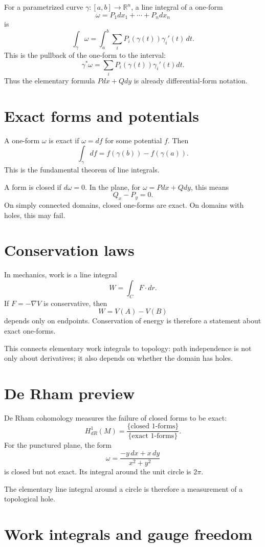 For a parametrized curve $\gamma:[a,b]\to\mathbb R^n$, a line integral of a one-form
\[
  \omega=P_1dx_1+\cdots+P_ndx_n
\]
is
\[
  \int_\gamma \omega
  =\int_a^b \sum_i P_i(\gamma(t))\gamma_i'(t)\,dt.
\]
This is the pullback of the one-form to the interval:
\[
  \gamma^*\omega=\sum_i P_i(\gamma(t))\gamma_i'(t)dt.
\]
Thus the elementary formula $Pdx+Qdy$ is already differential-form notation.

\section{Exact forms and potentials}

A one-form $\omega$ is exact if $\omega=df$ for some potential $f$.  Then
\[
  \int_\gamma df=f(\gamma(b))-f(\gamma(a)).
\]
This is the fundamental theorem of line integrals.

A form is closed if $d\omega=0$.  In the plane, for $\omega=Pdx+Qdy$, this means
\[
  Q_x-P_y=0.
\]
On simply connected domains, closed one-forms are exact.  On domains with holes, this may fail.

\section{Conservation laws}

In mechanics, work is a line integral
\[
  W=\int_C F\cdot dr.
\]
If $F=-\nabla V$ is conservative, then
\[
  W=V(A)-V(B)
\]
depends only on endpoints.  Conservation of energy is therefore a statement about exact one-forms.

This connects elementary work integrals to topology: path independence is not only about derivatives; it also depends on whether the domain has holes.

\section{De Rham preview}

De Rham cohomology measures the failure of closed forms to be exact:
\[
  H^1_{dR}(M)=\frac{\{\text{closed 1-forms}\}}{\{\text{exact 1-forms}\}}.
\]
For the punctured plane, the form
\[
  \omega=\frac{-y\,dx+x\,dy}{x^2+y^2}
\]
is closed but not exact.  Its integral around the unit circle is $2\pi$.

The elementary line integral around a circle is therefore a measurement of a topological hole.

\section{Work integrals and gauge freedom}

